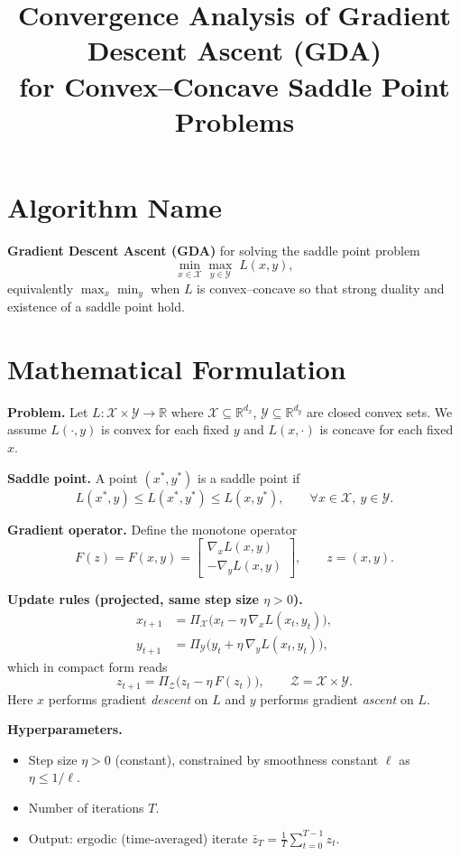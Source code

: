 \documentclass[11pt]{article}
\title{Convergence Analysis of Gradient Descent Ascent (GDA) \\ for Convex--Concave Saddle Point Problems}
\author{}
\date{}
\begin{document}
\maketitle

\section*{Algorithm Name}
\textbf{Gradient Descent Ascent (GDA)} for solving the saddle point problem
\[
\min_{x \in \mathcal{X}} \max_{y \in \mathcal{Y}} \; L(x,y),
\]
equivalently $\max_x \min_y$ when $L$ is convex--concave so that strong duality and existence of a saddle point hold.

\section*{Mathematical Formulation}

\textbf{Problem.} Let $L:\mathcal{X}\times\mathcal{Y}\to\mathbb{R}$ where
$\mathcal{X}\subseteq\mathbb{R}^{d_x}$, $\mathcal{Y}\subseteq\mathbb{R}^{d_y}$ are
closed convex sets. We assume $L(\cdot,y)$ is convex for each fixed $y$ and
$L(x,\cdot)$ is concave for each fixed $x$.

\medskip
\textbf{Saddle point.} A point $(x^*,y^*)$ is a saddle point if
\[
L(x^*,y) \le L(x^*,y^*) \le L(x,y^*), \qquad \forall x\in\mathcal{X},\ y\in\mathcal{Y}.
\]

\medskip
\textbf{Gradient operator.} Define the monotone operator
\[
F(z) = F(x,y) =
\begin{bmatrix}
\nabla_x L(x,y) \\
-\nabla_y L(x,y)
\end{bmatrix},
\qquad z=(x,y).
\]

\medskip
\textbf{Update rules (projected, same step size $\eta>0$).}
\begin{align}
x_{t+1} &= \Pi_{\mathcal{X}}\big( x_t - \eta\, \nabla_x L(x_t,y_t) \big), \\
y_{t+1} &= \Pi_{\mathcal{Y}}\big( y_t + \eta\, \nabla_y L(x_t,y_t) \big),
\end{align}
which in compact form reads
\[
z_{t+1} = \Pi_{\mathcal{Z}}\big( z_t - \eta\, F(z_t)\big),
\qquad \mathcal{Z}=\mathcal{X}\times\mathcal{Y}.
\]
Here $x$ performs gradient \emph{descent} on $L$ and $y$ performs gradient \emph{ascent} on $L$.

\medskip
\textbf{Hyperparameters.}
\begin{itemize}
\item Step size $\eta>0$ (constant), constrained by smoothness constant $\ell$ as $\eta \le 1/\ell$.
\item Number of iterations $T$.
\item Output: ergodic (time-averaged) iterate $\bar z_T = \frac{1}{T}\sum_{t=0}^{T-1} z_t$.
\end{itemize}
\end{document}
